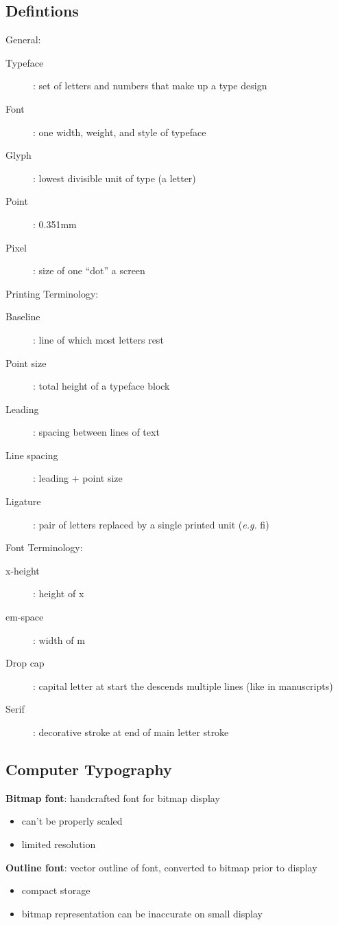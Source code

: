 \documentclass[]{article}
\theoremstyle{definition}
\begin{document}
	\subsection{Defintions}
	General:
	\begin{description}
		\item[Typeface]: set of letters and numbers that make up a type design
		\item[Font]: one width, weight, and style of typeface
		\item[Glyph]: lowest divisible unit of type (a letter)
		\item[Point]: 0.351mm
		\item[Pixel]: size of one ``dot'' a screen
	\end{description}
	Printing Terminology:
	\begin{description}
		\item[Baseline]: line of which most letters rest
		\item[Point size]: total height of a typeface block
		\item[Leading]: spacing between lines of text
		\item[Line spacing]: leading + point size
		\item[Ligature]: pair of letters replaced by a single printed unit (\textit{e.g.} fi)
	\end{description}
	Font Terminology:
	\begin{description}
		\item[x-height]: height of x
		\item[em-space]: width of m
		\item[Drop cap]: capital letter at start the descends multiple lines (like in manuscripts)
		\item[Serif]: decorative stroke at end of main letter stroke
	\end{description}

	\subsection{Computer Typography}
	\textbf{Bitmap font}: handcrafted font for bitmap display
	\begin{itemize}
		\item can't be properly scaled
		\item limited resolution
	\end{itemize}

	\textbf{Outline font}: vector outline of font, converted to bitmap prior to display
	\begin{itemize}
		\item compact storage
		\item bitmap representation can be inaccurate on small display
	\end{itemize}
\end{document}
